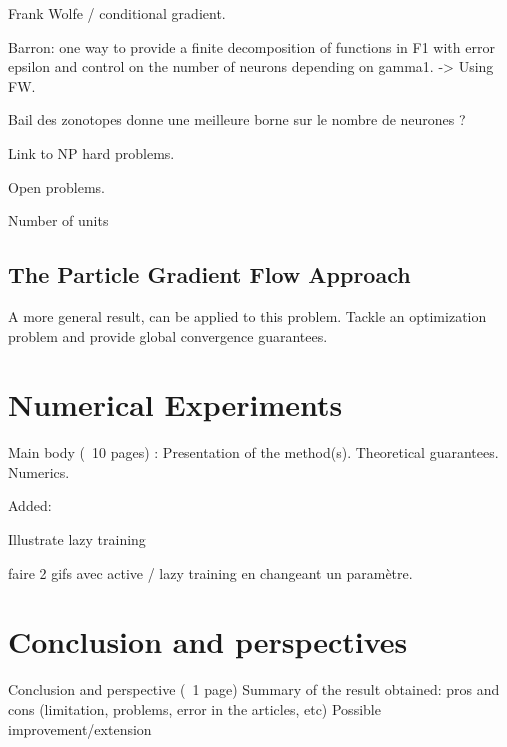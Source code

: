 \documentclass[a4paper, 11pt]{scrartcl}
\begin{document}
Frank Wolfe / conditional gradient.

Barron: one way to provide a finite decomposition of functions in F1 with error epsilon and control on the number of neurons depending on gamma1. -> Using FW.

Bail des zonotopes donne une meilleure borne sur le nombre de neurones ?

Link to NP hard problems.

Open problems.

Number of units

\subsection{The Particle Gradient Flow Approach}

A more general result, can be applied to this problem. Tackle an optimization problem and provide global convergence guarantees. \cite{chizat2018global}

\section{Numerical Experiments}

Main body (~10 pages) : 
Presentation of the method(s). 
Theoretical guarantees. 
Numerics. 


Added:

Illustrate lazy training \cite{chizat:hal-01945578}

faire 2 gifs avec active / lazy training en changeant un paramètre.

\section{Conclusion and perspectives}

Conclusion and perspective (~1 page)
Summary of the result obtained: pros and cons (limitation, problems, error in the articles, etc)
Possible improvement/extension



\end{document}

